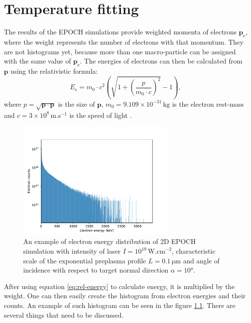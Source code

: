 \chapter{Temperature fitting}
The results of the EPOCH simulations provide weighted momenta of electrons $\bm{p}_\mathrm{e}$, where the weight represents the number of electrons with that momentum. They are not histograms yet, because more than one macro-particle can be assigned with the same value of $\bm{p}_\mathrm{e}$. The energies of electrons can then be calculated from $\bm{p}$ using the relativistic formula:
\begin{equation}
	\label{eq:rel-energy}
	E_\mathrm{e} = m_0\cdot c^2\left(\sqrt{1+\left(\frac{p}{m_0\cdot c}\right)^2} -1\right)\mathrm{,}
\end{equation}
where $p=\sqrt{\bm{p}\cdot\bm{p}}$ is the size of $\bm{p}$, $m_0 =  9.109 \times 10^{-31} \, \mathrm{kg}$ is the electron rest-mass and $c=3\times 10^{8} \, \mathrm{m . s}^{-1}$ is the speed of light \cite{cite-the-constants}.

\begin{figure}[h]
	\centering
	\includegraphics[width=0.7\textwidth]{figures/example-histogram}
	\caption{An example of electron energy distribution of 2D EPOCH simulation with intensity of laser $I=10^{19}\,\mathrm{W.cm}^{-2}$, characteristic scale of the exponential preplasma profile $L=0.1\,\mathrm{\mu m}$ and angle of incidence with respect to target normal direction $\alpha = 10$°.}
	\label{fig:example-histogram}
\end{figure}
After using equation \ref{eq:rel-energy} to calculate energy, it is multiplied by the weight. One can then easily create the histogram from electron energies and their counts. An example of such histogram can be seen in the figure \ref{fig:example-histogram}. There are several things that need to be discussed.

